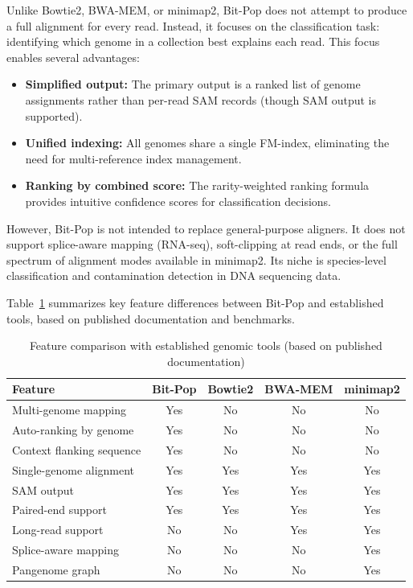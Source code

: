\documentclass[10pt]{article}
\begin{document}
Unlike Bowtie2, BWA-MEM, or minimap2, Bit-Pop does not attempt to produce a full alignment for every read. Instead, it focuses on the classification task: identifying which genome in a collection best explains each read. This focus enables several advantages:
\begin{itemize}
    \item \textbf{Simplified output:} The primary output is a ranked list of genome assignments rather than per-read SAM records (though SAM output is supported).
    \item \textbf{Unified indexing:} All genomes share a single FM-index, eliminating the need for multi-reference index management.
    \item \textbf{Ranking by combined score:} The rarity-weighted ranking formula provides intuitive confidence scores for classification decisions.
\end{itemize}

However, Bit-Pop is not intended to replace general-purpose aligners. It does not support splice-aware mapping (RNA-seq), soft-clipping at read ends, or the full spectrum of alignment modes available in minimap2. Its niche is species-level classification and contamination detection in DNA sequencing data.

Table~\ref{tab:comparison} summarizes key feature differences between Bit-Pop and established tools, based on published documentation and benchmarks.

\begin{table}[htbp]
\centering
\caption{Feature comparison with established genomic tools (based on published documentation)}
\label{tab:comparison}
\begin{tabular}{lcccc}
\toprule
\textbf{Feature} & \textbf{Bit-Pop} & \textbf{Bowtie2} & \textbf{BWA-MEM} & \textbf{minimap2} \\
\midrule
Multi-genome mapping & Yes & No & No & No \\
Auto-ranking by genome & Yes & No & No & No \\
Context flanking sequence & Yes & No & No & No \\
Single-genome alignment & Yes & Yes & Yes & Yes \\
SAM output & Yes & Yes & Yes & Yes \\
Paired-end support & Yes & Yes & Yes & Yes \\
Long-read support & No & No & Yes & Yes \\
Splice-aware mapping & No & No & No & Yes \\
Pangenome graph & No & No & No & Yes \\
\bottomrule
\end{tabular}
\end{table}
\end{document}
